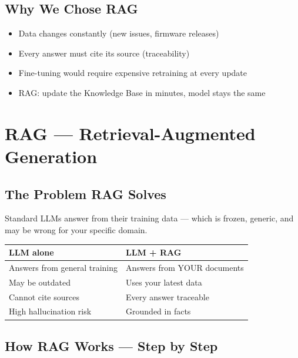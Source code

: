 \documentclass[11pt,a4paper]{report}
\begin{document}
\section{Why We Chose RAG}

\begin{itemize}
    \item Data changes constantly (new issues, firmware releases)
    \item Every answer must cite its source (traceability)
    \item Fine-tuning would require expensive retraining at every update
    \item RAG: update the Knowledge Base in minutes, model stays the same
\end{itemize}

\chapter{RAG --- Retrieval-Augmented Generation}

\section{The Problem RAG Solves}

Standard LLMs answer from their training data --- which is frozen, generic, and may be wrong for your specific domain.

\begin{table}[h]
\centering
\begin{tabularx}{\textwidth}{X X}
\toprule
\textbf{LLM alone} & \textbf{LLM + RAG} \\
\midrule
Answers from general training & Answers from YOUR documents \\
May be outdated & Uses your latest data \\
Cannot cite sources & Every answer traceable \\
High hallucination risk & Grounded in facts \\
\bottomrule
\end{tabularx}
\end{table}

\section{How RAG Works --- Step by Step}
\end{document}
